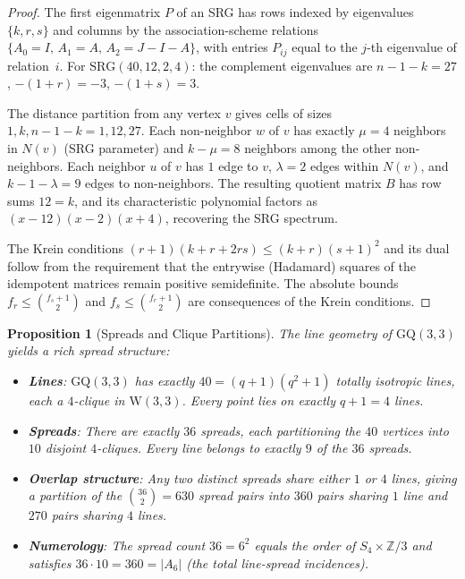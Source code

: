 \documentclass[12pt,a4paper]{article}
\newtheorem{proposition}[theorem]{Proposition}
\newcommand{\W}{\mathrm{W}(3,3)}
\begin{document}
\begin{proof}
The first eigenmatrix $P$ of an SRG has rows indexed by eigenvalues $\{k, r, s\}$
and columns by the association-scheme relations $\{A_0 = I,\, A_1 = A,\, A_2 = J - I - A\}$,
with entries $P_{ij}$ equal to the $j$-th eigenvalue of relation~$i$.  For
$\mathrm{SRG}(40,12,2,4)$: the complement eigenvalues are $n{-}1{-}k = 27$,
$-(1{+}r) = -3$, $-(1{+}s) = 3$.

The distance partition from any vertex $v$ gives cells of sizes $1, k, n{-}1{-}k = 1, 12, 27$.
Each non-neighbor $w$ of $v$ has exactly $\mu = 4$ neighbors in $N(v)$ (SRG parameter) and
$k - \mu = 8$ neighbors among the other non-neighbors.  Each neighbor $u$ of $v$ has $1$
edge to $v$, $\lambda = 2$ edges within $N(v)$, and $k - 1 - \lambda = 9$ edges to non-neighbors.
The resulting quotient matrix $B$ has row sums $12 = k$, and its characteristic polynomial
factors as $(x - 12)(x - 2)(x + 4)$, recovering the SRG spectrum.

The Krein conditions $(r{+}1)(k{+}r{+}2rs) \le (k{+}r)(s{+}1)^2$ and its dual follow from
the requirement that the entrywise (Hadamard) squares of the idempotent matrices remain
positive semidefinite.  The absolute bounds $f_r \le \binom{f_s + 1}{2}$ and
$f_s \le \binom{f_r + 1}{2}$ are consequences of the Krein conditions.
\end{proof}


\begin{proposition}[Spreads and Clique Partitions]\label{prop:spreads}
The line geometry of $\mathrm{GQ}(3,3)$ yields a rich spread structure:
\begin{itemize}
  \item \textbf{Lines}: $\mathrm{GQ}(3,3)$ has exactly $40 = (q{+}1)(q^2{+}1)$
        totally isotropic lines, each a $4$-clique in $\W$.
        Every point lies on exactly $q{+}1 = 4$ lines.
  \item \textbf{Spreads}: There are exactly $36$ spreads, each partitioning the
        $40$ vertices into $10$ disjoint $4$-cliques.
        Every line belongs to exactly $9$ of the $36$ spreads.
  \item \textbf{Overlap structure}: Any two distinct spreads share either $1$ or $4$
        lines, giving a partition of the $\binom{36}{2} = 630$ spread pairs into
        $360$ pairs sharing $1$ line and $270$ pairs sharing $4$ lines.
  \item \textbf{Numerology}: The spread count $36 = 6^2$ equals the order of
        $S_4 \times \mathbb{Z}/3$ and satisfies $36 \cdot 10 = 360 = |A_6|$
        (the total line-spread incidences).
\end{itemize}
\end{proposition}
\end{document}
